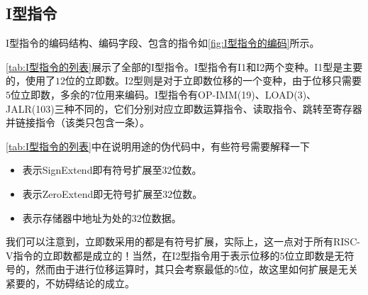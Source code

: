 \subsection{I型指令}
I型指令的编码结构、编码字段、包含的指令如\cref{fig:I型指令的编码}所示。

\cref{tab:I型指令的列表}展示了全部的I型指令。I型指令有I1和I2两个变种。I1型是主要的，使用了$12$位的立即数。I2型则是对于立即数位移的一个变种，由于位移只需要$5$位立即数，多余的$7$位用来编码。I型指令有OP-IMM(19)、LOAD(3)、JALR(103)三种不同的，它们分别对应立即数运算指令、读取指令、跳转至寄存器并链接指令（该类只包含一条）。

\cref{tab:I型指令的列表}中在说明用途的伪代码中，有些符号需要解释一下
\begin{itemize}
    \item {}表示SignExtend即有符号扩展至$32$位数。
    \item {}表示ZeroExtend即无符号扩展至$32$位数。
    \item \code{[Address]}表示存储器中地址为处的$32$位数据。
\end{itemize}

我们可以注意到，立即数采用的都是有符号扩展，实际上，这一点对于所有RISC-V指令的立即数都是成立的！当然，在I2型指令用于表示位移的$5$位立即数是无符号的，然而由于进行位移运算时，其只会考察最低的$5$位，故这里如何扩展是无关紧要的，不妨碍结论的成立。
\begin{Figure}[I型指令的编码]

\end{Figure}

